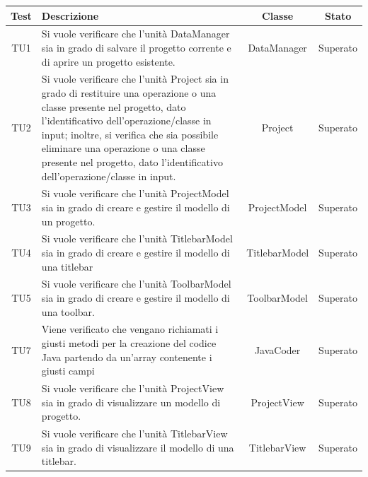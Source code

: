 \documentclass[../PianoDiQualifica.tex]{subfiles}
\begin{document}
		\begin{longtable}{|c|>{\centering}p{8cm}|c|c|}
		\hline
		\textbf{Test} & \textbf{Descrizione} & \textbf{Classe} & \textbf{Stato}\\
		\hline
		 \hypertarget{TU1}{TU1} &Si vuole verificare che l'unità DataManager sia in grado di salvare il progetto corrente e di aprire un progetto esistente. & DataManager & Superato\\
		\hline
		\hypertarget{TU2}{TU2}&  Si vuole verificare che l'unità Project sia in grado di restituire una operazione o una classe presente nel progetto, dato l'identificativo dell'operazione/classe in input; inoltre, si verifica che sia possibile eliminare una operazione o una classe presente nel progetto, dato l'identificativo dell'operazione/classe in input. & Project  & Superato\\
		\hline
		\hypertarget{TU3}{TU3} & Si vuole verificare che l'unità ProjectModel sia in grado di creare e gestire il modello di un progetto. & ProjectModel &Superato\\
		\hline
		\hypertarget{TU4}{TU4}& Si vuole verificare che l'unità TitlebarModel sia in grado di creare e gestire il modello di una titlebar & TitlebarModel  &Superato\\
		\hline
		\hypertarget{TU5}{TU5} &Si vuole verificare che l'unità ToolbarModel sia in grado di creare e gestire il modello di una toolbar. &ToolbarModel &Superato\\
		\hline
		\hypertarget{TU7}{TU7}&Viene verificato che vengano richiamati i giusti metodi per la creazione del codice Java partendo da un'array contenente i giusti campi &JavaCoder &Superato\\
		\hline
		\hypertarget{TU8}{TU8} &Si vuole verificare che l'unità ProjectView sia in grado di visualizzare un modello di progetto.& ProjectView &Superato\\
		\hline
		\hypertarget{TU9}{TU9} &Si vuole verificare che l'unità TitlebarView sia in grado di visualizzare il modello di una titlebar.& TitlebarView &Superato\\
		
		\hline
		

\end{longtable}
\end{document}
